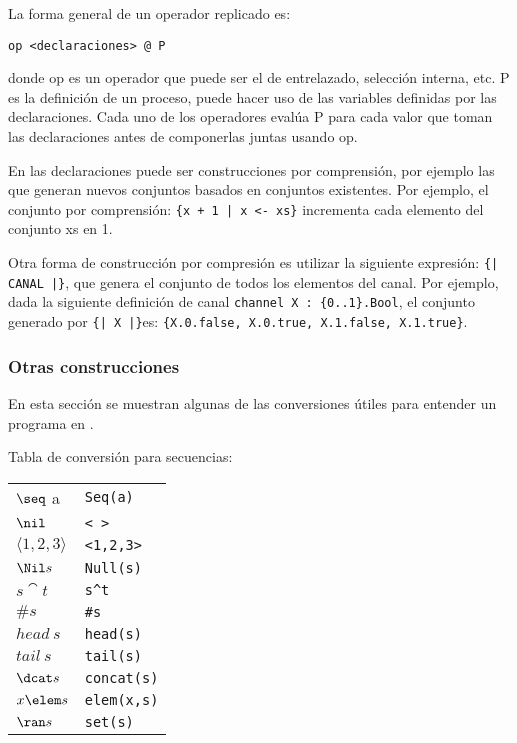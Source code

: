La forma general de un operador replicado es:

\begin{verbatim}
op <declaraciones> @ P
\end{verbatim}

donde op es un operador que puede ser el de entrelazado, selección interna, etc. P es la definición de un proceso, puede hacer uso de las variables definidas por las declaraciones. Cada uno de los operadores evalúa P para cada valor que toman las declaraciones antes de componerlas juntas usando op.

En \CSPm las declaraciones puede ser construcciones por comprensión, por ejemplo las que generan nuevos conjuntos basados en conjuntos existentes. Por ejemplo, el conjunto por comprensión: \verb={x + 1 | x <- xs}= incrementa cada elemento del conjunto xs en 1. 

Otra forma de construcción por compresión es utilizar la siguiente expresión: \verb={| CANAL |}=, que genera el conjunto de todos los elementos del canal. Por ejemplo, dada la siguiente definición de canal \verb=channel X : {0..1}.Bool=, el conjunto generado por \verb={| X |}=es: \verb={X.0.false, X.0.true, X.1.false, X.1.true}=.



\subsubsection{Otras construcciones}
En esta sección se muestran algunas de las conversiones útiles para entender un programa en \CSPm.

Tabla de conversión para secuencias:

\begin{center}
\begin{tabular}{ l l }
  $\seq$ a & \verb|Seq(a)| \\
  $\nil$ & \verb|< >| \\
  $\langle 1, 2, 3 \rangle$ & \verb|<1,2,3>| \\
  $\Nil s$ & \verb=Null(s)=
  \\
  $s \cat t$ & \verb=s^t=
  \\
  $\# s$ & \verb|#s|
  \\
  $head~s$ & \verb|head(s)|
  \\
  $tail~s$ & \verb|tail(s)|
  \\
  $\dcat s$ & \verb|concat(s)|
  \\
  $x \elem s$ & \verb=elem(x,s)=
  \\
  $\ran s$ &  \verb|set(s)|
  
\end{tabular}
\end{center}

